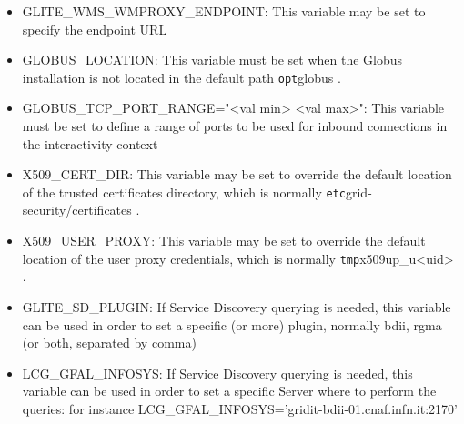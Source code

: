 \begin{itemize}



\item GLITE\_WMS\_WMPROXY\_ENDPOINT: This variable may be set to specify the endpoint URL


\item GLOBUS\_LOCATION: This variable must be set when the Globus installation is not located in the default path \verb /opt/globus {}.


\item GLOBUS\_TCP\_PORT\_RANGE="<val min> <val max>": This variable must be set to define a range of ports to be used for inbound connections in the interactivity context


\item X509\_CERT\_DIR: This variable may be set to override the default location of the trusted certificates directory, which is normally \verb /etc/grid-security/certificates {}.


\item X509\_USER\_PROXY: This variable may be set to override the default location of the user proxy credentials, which is normally \verb /tmp/x509up_u<uid> {}.


\item GLITE\_SD\_PLUGIN: If Service Discovery querying is needed, this variable can be used in order to set a specific (or more) plugin, normally bdii, rgma (or both, separated by comma)


\item LCG\_GFAL\_INFOSYS: If Service Discovery querying is needed, this variable can be used in order to set a specific Server where to perform the queries: for instance LCG\_GFAL\_INFOSYS='gridit-bdii-01.cnaf.infn.it:2170'


\end{itemize}

